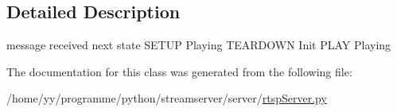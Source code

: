 \subsection{Detailed Description}
\begin{DoxyVerb}message received    next state
        SETUP               Playing 
        TEARDOWN            Init
        PLAY                Playing\end{DoxyVerb}
 

The documentation for this class was generated from the following file:\begin{DoxyCompactItemize}
\item 
/home/yy/programme/python/streamserver/server/\hyperlink{rtspServer_8py}{rtspServer.py}\end{DoxyCompactItemize}
